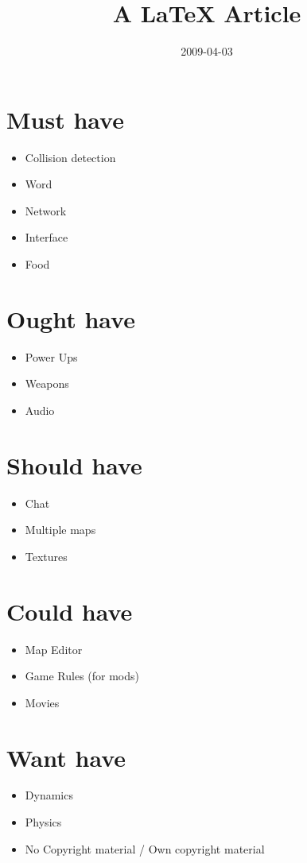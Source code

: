 \documentclass[]{article}
\title{A LaTeX Article}
\author{  }
\date{2009-04-03}
\begin{document}
\ifpdf
{}
\else
{}
\fi

\maketitle


\begin{abstract}
\end{abstract}

\section{Must have} %
\label{sec:must_have}
 \begin{itemize}
  \item Collision detection
  \item Word
  \item Network
  \item Interface
  \item Food
 \end{itemize}

\section{Ought have} %
\label{sec:ought_have}
\begin{itemize}
  \item Power Ups
  \item Weapons
  \item Audio
\end{itemize}

\section{Should have} %
\label{sec:should_have}
\begin{itemize}
  \item Chat
  \item Multiple maps
  \item Textures
\end{itemize}

\section{Could have} %
\label{sec:could_have}
\begin{itemize}
  \item Map Editor
  \item Game Rules (for mods)
  \item Movies
\end{itemize}

\section{Want have} %
\label{sec:want_have}
\begin{itemize}
  \item Dynamics
  \item Physics
  \item No Copyright material / Own copyright material
\end{itemize}



\end{document}

